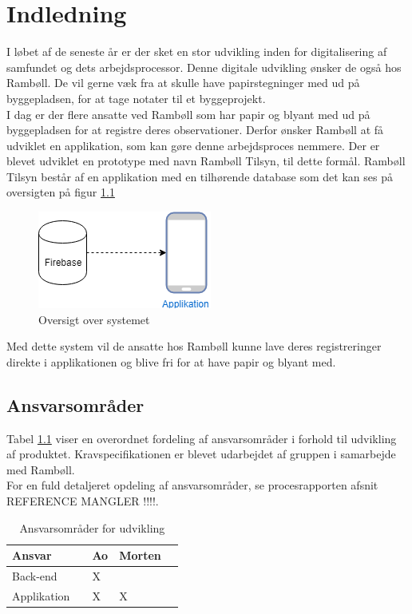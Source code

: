 \chapter{Indledning}

I løbet af de seneste år er der sket en stor udvikling inden for digitalisering af samfundet og dets arbejdsprocessor. Denne digitale udvikling ønsker de også hos Rambøll. De vil gerne væk fra at skulle have papirstegninger med ud på byggepladsen, for at tage notater til et byggeprojekt. \\
I dag er der flere ansatte ved Rambøll som har papir og blyant med ud på byggepladsen for at registre deres observationer. Derfor ønsker Rambøll at få udviklet en applikation, som kan gøre denne arbejdsproces nemmere.
Der er blevet udviklet en prototype med navn Rambøll Tilsyn, til dette formål.
Rambøll Tilsyn består af en applikation med en tilhørende database som det kan ses på oversigten på figur \ref{fig:OversigtSystembeskrivelse}


\begin{figure}[H]
	\centering
	\includegraphics[width=0.4\linewidth]{Indledning/Oversigtoversystem}
	\caption{Oversigt over systemet}
	\label{fig:OversigtSystembeskrivelse}
\end{figure}

Med dette system vil de ansatte hos Rambøll kunne lave deres registreringer direkte i applikationen og blive fri for at have papir og blyant med. \\

\section*{Ansvarsområder}
Tabel \ref{Produktansvar} viser en overordnet fordeling af ansvarsområder i forhold til udvikling af produktet. Kravspecifikationen er blevet udarbejdet af gruppen i samarbejde med Rambøll. \\
For en fuld detaljeret opdeling af ansvarsområder, se procesrapporten afsnit REFERENCE MANGLER !!!!.

\begin{table}[H]
	\centering
	\begin{tabular}{lllll} \hline
		\textbf{Ansvar} &  & \textbf{Ao}&  \textbf{Morten}&  \\ \hline
		Back-end&  &  X&  &  \\ \hline
		Applikation&  &  X&  X&  \\ \hline
	\end{tabular}
	\caption{Ansvarsområder for udvikling}
	\label{Produktansvar}
\end{table}